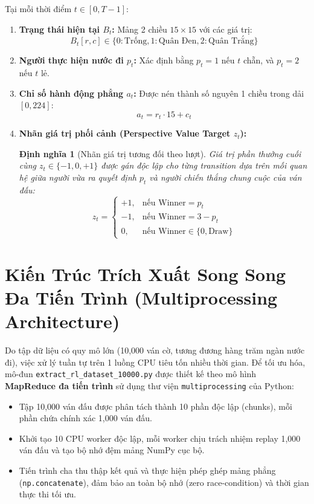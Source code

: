 \documentclass[11pt,a4paper]{report}
\newtheorem{definition}{Định nghĩa}[chapter]
\begin{document}
Tại mỗi thời điểm $t \in [0, T-1]$:
\begin{enumerate}
    \item \textbf{Trạng thái hiện tại $B_t$:} Mảng 2 chiều $15 \times 15$ với các giá trị:
    \begin{equation}
        B_t[r, c] \in \{0: \text{Trống}, 1: \text{Quân Đen}, 2: \text{Quân Trắng}\}
    \end{equation}
    \item \textbf{Người thực hiện nước đi $p_t$:} Xác định bằng $p_t = 1$ nếu $t$ chẵn, và $p_t = 2$ nếu $t$ lẻ.
    \item \textbf{Chỉ số hành động phẳng $a_t$:} Được nén thành số nguyên 1 chiều trong dải $[0, 224]$:
    \begin{equation}
        a_t = r_t \cdot 15 + c_t
    \end{equation}
    \item \textbf{Nhãn giá trị phối cảnh (Perspective Value Target $z_t$):}
    \begin{definition}[Nhãn giá trị tương đối theo lượt]
    Giá trị phần thưởng cuối cùng $z_t \in \{-1, 0, +1\}$ được gán độc lập cho từng transition dựa trên mối quan hệ giữa người vừa ra quyết định $p_t$ và người chiến thắng chung cuộc của ván đấu:
    \begin{equation}
        z_t = \begin{cases} 
            +1, & \text{nếu } \text{Winner} = p_t \\
            -1, & \text{nếu } \text{Winner} = 3 - p_t \\
            0, & \text{nếu } \text{Winner} \in \{0, \text{Draw}\}
        \end{cases}
    \end{equation}
    \end{definition}
\end{enumerate}

\section{Kiến Trúc Trích Xuất Song Song Đa Tiến Trình (Multiprocessing Architecture)}

Do tập dữ liệu có quy mô lớn (10,000 ván cờ, tương đương hàng trăm ngàn nước đi), việc xử lý tuần tự trên 1 luồng CPU tiêu tốn nhiều thời gian. Để tối ưu hóa, mô-đun \texttt{extract\_rl\_dataset\_10000.py} được thiết kế theo mô hình \textbf{MapReduce đa tiến trình} sử dụng thư viện \texttt{multiprocessing} của Python:
\begin{itemize}
    \item Tập 10,000 ván đấu được phân tách thành 10 phần độc lập (chunks), mỗi phần chứa chính xác 1,000 ván đấu.
    \item Khởi tạo 10 CPU worker độc lập, mỗi worker chịu trách nhiệm replay 1,000 ván đấu và tạo bộ nhớ đệm mảng NumPy cục bộ.
    \item Tiến trình cha thu thập kết quả và thực hiện phép ghép mảng phẳng (\texttt{np.concatenate}), đảm bảo an toàn bộ nhớ (zero race-condition) và thời gian thực thi tối ưu.
\end{itemize}
\end{document}
